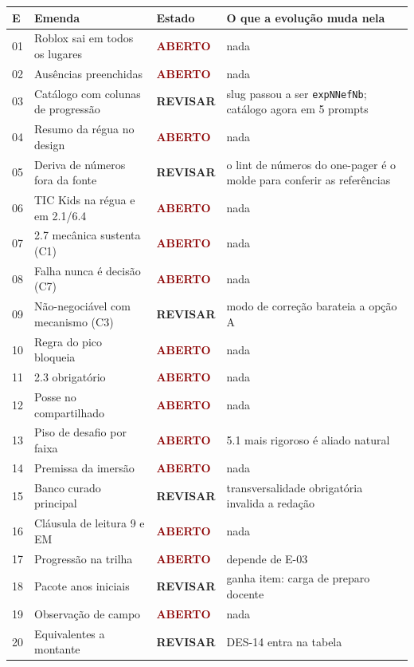 \documentclass[11pt,a4paper]{article}
\newcommand{\aberto}{\textcolor{DarkRed}{\textbf{ABERTO}}}
\newcommand{\revisar}{\textcolor{DarkYellow}{\textbf{REVISAR}}}
\begin{document}
\begin{center}\small
\begin{tabular}{@{}l p{6.2cm} p{2.4cm} p{5.4cm}@{}}
\toprule
\textbf{E} & \textbf{Emenda} & \textbf{Estado} & \textbf{O que a evolução muda nela} \\
\midrule
01 & Roblox sai em todos os lugares & \aberto & nada \\
02 & Ausências preenchidas & \aberto & nada \\
03 & Catálogo com colunas de progressão & \revisar & slug passou a ser \texttt{expNNefNb}; catálogo agora em 5 prompts \\
04 & Resumo da régua no design & \aberto & nada \\
05 & Deriva de números fora da fonte & \revisar & o lint de números do one-pager é o molde para conferir as referências \\
06 & TIC Kids na régua e em 2.1/6.4 & \aberto & nada \\
07 & 2.7 mecânica sustenta (C1) & \aberto & nada \\
08 & Falha nunca é decisão (C7) & \aberto & nada \\
09 & Não-negociável com mecanismo (C3) & \revisar & modo de correção barateia a opção A \\
10 & Regra do pico bloqueia & \aberto & nada \\
11 & 2.3 obrigatório & \aberto & nada \\
12 & Posse no compartilhado & \aberto & nada \\
13 & Piso de desafio por faixa & \aberto & 5.1 mais rigoroso é aliado natural \\
14 & Premissa da imersão & \aberto & nada \\
15 & Banco curado principal & \revisar & transversalidade obrigatória invalida a redação \\
16 & Cláusula de leitura 9\textordmasculine{} e EM & \aberto & nada \\
17 & Progressão na trilha & \aberto & depende de E-03 \\
18 & Pacote anos iniciais & \revisar & ganha item: carga de preparo docente \\
19 & Observação de campo & \aberto & nada \\
20 & Equivalentes a montante & \revisar & DES-14 entra na tabela \\
\bottomrule
\end{tabular}
\end{center}

\end{document}
